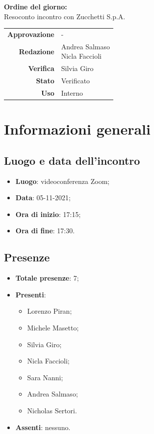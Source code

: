 \documentclass[11pt]{article}
\begin{document}
\begin{titlepage}
\begin{center}
			\large
			
			\vfill
			\textbf{Ordine del giorno:} \\
			Resoconto incontro con Zucchetti S.p.A.
			\vfill
			
			\begin{tabular}{r|l}
				\textbf{Approvazione} &  -\\
				\textbf{Redazione} &  \parbox[t]{3.5cm}{Andrea Salmaso \\Nicla Faccioli}\\
				\textbf{Verifica} &  Silvia Giro\\
				\textbf{Stato} & Verificato \\
				\textbf{Uso} & Interno
			\end{tabular}
			\vfill
			
		\end{center}
	\end{titlepage}

	\newpage
	
	\section{Informazioni generali}
	\subsection{Luogo e data dell'incontro}
	\begin{itemize}
		\item \textbf{Luogo}: videoconferenza Zoom;
		\item \textbf{Data}: 05-11-2021;
		\item \textbf{Ora di inizio}: 17:15;
		\item \textbf{Ora di fine}: 17:30.
	\end{itemize}
	
	\subsection{Presenze}
	\begin{itemize}
		\item \textbf{Totale presenze}: 7;
		\item \textbf{Presenti}:
		\begin{itemize}
			\item Lorenzo Piran; 
			\item Michele Masetto;
			\item Silvia Giro;
			\item Nicla Faccioli;
			\item Sara Nanni;
			\item Andrea Salmaso;
			\item Nicholas Sertori.
		\end{itemize}
		\item \textbf{Assenti}: nessuno.
	\end{itemize}
	
\end{document}
